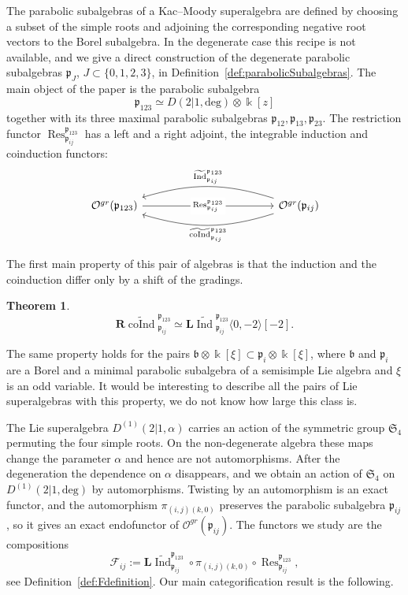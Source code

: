 \documentclass[10pt]{amsart}
\newcommand{\sh}[2]{\langle #1,#2\rangle}
\newtheorem{theoremA}{Theorem}
\newcommand{\fb}{{\mathfrak b}}
\newcommand{\fp}{{\mathfrak p}}
\newcommand{\Ddeg}{D(2|1,\mathrm{deg})}
\newcommand{\Daff}{D^{(1)}(2|1,\mathrm{deg})}
\newcommand{\Lind}{\mathbf{L}\widetilde{\Ind}}
\newcommand{\Rcoind}{\mathbf{R}\widetilde{\coInd}}
\DeclareMathOperator{\Res}{Res}
\DeclareMathOperator{\Ind}{Ind}
\DeclareMathOperator{\coInd}{coInd}
\begin{document}
	The parabolic subalgebras of a Kac--Moody superalgebra are defined by choosing a subset of the simple roots and adjoining the corresponding negative root vectors to the Borel subalgebra. In the degenerate case this recipe is not available, and we give a direct construction of the degenerate parabolic subalgebras $\fp_J$, $J\subset\{0,1,2,3\}$, in Definition~\ref{def:parabolicSubalgebras}. The main object of the paper is the parabolic subalgebra
	\[\fp_{123}\simeq \Ddeg\otimes\Bbbk[z]\]
	together with its three maximal parabolic subalgebras $\fp_{12},\fp_{13},\fp_{23}$. The restriction functor $\Res_{\fp_{ij}}^{\fp_{123}}$ has a left and a right adjoint, the integrable induction and coinduction functors:
	\begin{equation*}
		\begin{tikzcd}[column sep=4.2cm]
			\mathcal{O}^{gr}(\fp_{123})
			\arrow[r, "{\Res_{\fp_{ij}}^{\fp_{123}}}" description]
			& \mathcal{O}^{gr}(\fp_{ij})
			\arrow[l, bend right=17, "{\widetilde{\Ind}_{\fp_{ij}}^{\fp_{123}}}"']
			\arrow[l, bend left=17, "{\widetilde{\coInd}_{\fp_{ij}}^{\fp_{123}}}"]
		\end{tikzcd}
	\end{equation*}
	
	The first main property of this pair of algebras is that the induction and the coinduction differ only by a shift of the gradings.
	
	\begin{theoremA}
		\begin{equation}\label{eq:IndCoind}
			{\Rcoind}_{\fp_{ij}}^{\fp_{123}}\simeq {\Lind}_{\fp_{ij}}^{\fp_{123}}\sh{0}{-2}[-2].
		\end{equation}
	\end{theoremA}
	
	The same property holds for the pairs $\fb\otimes\Bbbk[\xi]\subset\fp_i\otimes\Bbbk[\xi]$, where $\fb$ and $\fp_i$ are a Borel and a minimal parabolic subalgebra of a semisimple Lie algebra and $\xi$ is an odd variable. It would be interesting to describe all the pairs of Lie superalgebras with this property, we do not know how large this class is.
	
	The Lie superalgebra $D^{(1)}(2|1,\alpha)$ carries an action of the symmetric group $\mathfrak{S}_4$ permuting the four simple roots. On the non-degenerate algebra these maps change the parameter $\alpha$ and hence are not automorphisms. After the degeneration the dependence on $\alpha$ disappears, and we obtain an action of $\mathfrak{S}_4$ on $\Daff$ by automorphisms. Twisting by an automorphism is an exact functor, and the automorphism $\pi_{(i,j)(k,0)}$ preserves the parabolic subalgebra $\fp_{ij}$, so it gives an exact endofunctor of $\mathcal{O}^{gr}(\fp_{ij})$. The functors we study are the compositions
	\[\mathcal{F}_{ij}:=\Lind_{\fp_{ij}}^{\fp_{123}} \circ \pi_{(i,j)(k,0)}\circ {\Res}_{\fp_{ij}}^{\fp_{123}},\]
	see Definition~\ref{def:Fdefinition}. Our main categorification result is the following.
	
\end{document}
